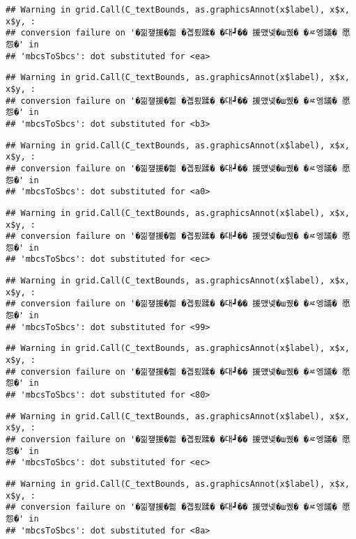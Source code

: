 \documentclass[
]{article}
\begin{document}
\begin{verbatim}
## Warning in grid.Call(C_textBounds, as.graphicsAnnot(x$label), x$x, x$y, :
## conversion failure on '�낆쟾援�쁾 �곕룄蹂� �대┛�� 援먰넻�ш퀬� �ㅼ엥議� 愿怨�' in
## 'mbcsToSbcs': dot substituted for <ea>
\end{verbatim}

\begin{verbatim}
## Warning in grid.Call(C_textBounds, as.graphicsAnnot(x$label), x$x, x$y, :
## conversion failure on '�낆쟾援�쁾 �곕룄蹂� �대┛�� 援먰넻�ш퀬� �ㅼ엥議� 愿怨�' in
## 'mbcsToSbcs': dot substituted for <b3>
\end{verbatim}

\begin{verbatim}
## Warning in grid.Call(C_textBounds, as.graphicsAnnot(x$label), x$x, x$y, :
## conversion failure on '�낆쟾援�쁾 �곕룄蹂� �대┛�� 援먰넻�ш퀬� �ㅼ엥議� 愿怨�' in
## 'mbcsToSbcs': dot substituted for <a0>
\end{verbatim}

\begin{verbatim}
## Warning in grid.Call(C_textBounds, as.graphicsAnnot(x$label), x$x, x$y, :
## conversion failure on '�낆쟾援�쁾 �곕룄蹂� �대┛�� 援먰넻�ш퀬� �ㅼ엥議� 愿怨�' in
## 'mbcsToSbcs': dot substituted for <ec>
\end{verbatim}

\begin{verbatim}
## Warning in grid.Call(C_textBounds, as.graphicsAnnot(x$label), x$x, x$y, :
## conversion failure on '�낆쟾援�쁾 �곕룄蹂� �대┛�� 援먰넻�ш퀬� �ㅼ엥議� 愿怨�' in
## 'mbcsToSbcs': dot substituted for <99>
\end{verbatim}

\begin{verbatim}
## Warning in grid.Call(C_textBounds, as.graphicsAnnot(x$label), x$x, x$y, :
## conversion failure on '�낆쟾援�쁾 �곕룄蹂� �대┛�� 援먰넻�ш퀬� �ㅼ엥議� 愿怨�' in
## 'mbcsToSbcs': dot substituted for <80>
\end{verbatim}

\begin{verbatim}
## Warning in grid.Call(C_textBounds, as.graphicsAnnot(x$label), x$x, x$y, :
## conversion failure on '�낆쟾援�쁾 �곕룄蹂� �대┛�� 援먰넻�ш퀬� �ㅼ엥議� 愿怨�' in
## 'mbcsToSbcs': dot substituted for <ec>
\end{verbatim}

\begin{verbatim}
## Warning in grid.Call(C_textBounds, as.graphicsAnnot(x$label), x$x, x$y, :
## conversion failure on '�낆쟾援�쁾 �곕룄蹂� �대┛�� 援먰넻�ш퀬� �ㅼ엥議� 愿怨�' in
## 'mbcsToSbcs': dot substituted for <8a>
\end{verbatim}
\end{document}
